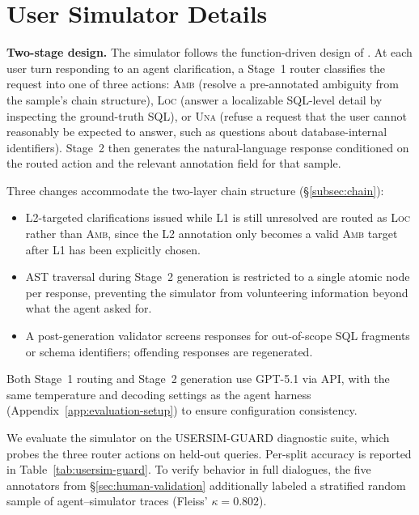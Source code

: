 \section{User Simulator Details}
\label{app:user-sim}

\noindent\textbf{Two-stage design.} The simulator follows the function-driven design of  \citet{huo2026interact}. At each user turn responding to an agent  clarification, a Stage~1 router classifies the request into one of  three actions: \textsc{Amb} (resolve a pre-annotated ambiguity from  the sample's chain structure), \textsc{Loc} (answer a localizable SQL-level detail by inspecting the ground-truth SQL), or \textsc{Una} (refuse a request that the user cannot reasonably be expected to answer, such as questions about database-internal identifiers). Stage~2 then generates the natural-language response conditioned on the routed action and the relevant annotation field  for that sample.

 Three changes accommodate the two-layer chain structure 
(\S\ref{subsec:chain}):
\begin{itemize}[leftmargin=1.2em,itemsep=0.18em,topsep=0.25em]
\item L2-targeted clarifications issued while L1 is still unresolved are routed as \textsc{Loc} rather than \textsc{Amb}, since the L2 annotation only becomes a valid \textsc{Amb} target after L1 has been explicitly chosen.

\item AST traversal during Stage~2 generation is restricted to a single atomic node per response, preventing the simulator from volunteering information beyond what the agent asked for.

\item A post-generation validator screens responses for out-of-scope SQL fragments or schema identifiers; offending responses are regenerated.
\end{itemize}

Both Stage~1 routing and Stage~2 generation use GPT-5.1 via API, with the same temperature and decoding settings as the agent harness (Appendix~\ref{app:evaluation-setup}) to ensure configuration consistency.

We evaluate the simulator on the USERSIM-GUARD diagnostic suite, which probes the three router actions on held-out queries. Per-split accuracy is reported in Table~\ref{tab:usersim-guard}. To verify behavior in full dialogues, the five annotators from \S\ref{sec:human-validation} additionally labeled a stratified random sample of agent--simulator traces (Fleiss' $\kappa = 0.802$).


